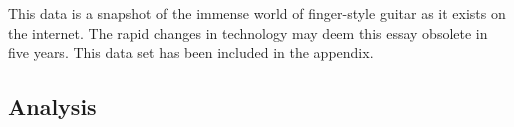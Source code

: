 \documentclass[nofonts,nobib]{tufte-handout}
\begin{document}
This data is a snapshot of the immense world of finger-style guitar as it
exists on the internet. The rapid changes in technology may deem this essay
obsolete in five years. This data set has been included in the appendix.
\subsection{Analysis}
\label{sec:analysis}
\end{document}

